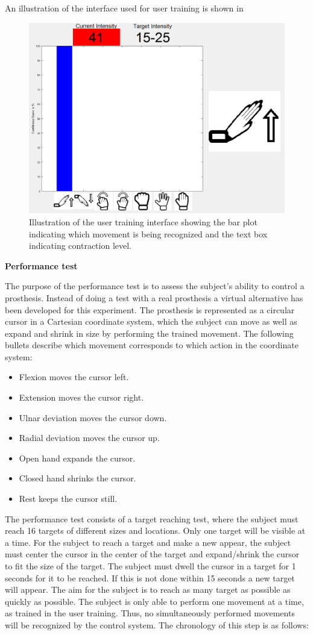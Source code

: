 An illustration of the interface used for user training is shown in 

\begin{figure}[H]                 
	\includegraphics[width=.4\textwidth]{figures/xBackground/usertraincontrolGUI}  
	\caption{Illustration of the user training interface showing the bar plot indicating which movement is being recognized and the text box indicating contraction level.}
	\label{fig:usertraincontrolGUI} 
\end{figure}

\textbf{Performance test}

The purpose of the performance test is to assess the subject's ability to control a prosthesis. Instead of doing a test with a real prosthesis a virtual alternative has been developed for this experiment. The prosthesis is represented as a circular cursor in a Cartesian coordinate system, which the subject can move as well as expand and shrink in size by performing the trained movement. The following bullets describe which movement corresponds to which action in the coordinate system:

\begin{itemize}
	\item Flexion moves the cursor left.
	\item Extension moves the cursor right.
	\item Ulnar deviation moves the cursor down.
	\item Radial deviation moves the cursor up.
	\item Open hand expands the cursor.
	\item Closed hand shrinks the cursor.
	\item Rest keeps the cursor still.
\end{itemize}

 The performance test consists of a target reaching test, where the subject must reach 16 targets of different sizes and locations. Only one target will be visible at a time. For the subject to reach a target and make a new appear, the subject must center the cursor in the center of the target and expand/shrink the cursor to fit the size of the target. The subject must dwell the cursor in a target for 1 seconds for it to be reached. If this is not done within 15 seconds a new target will appear. The aim for the subject is to reach as many target as possible as quickly as possible. The subject is only able to perform one movement at a time, as trained in the user training. Thus, no simultaneously performed movements will be recognized by the control system. The chronology of this step is as follows:

